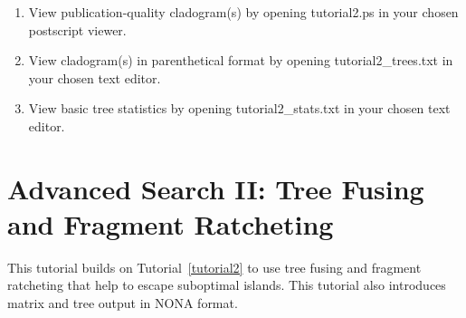 \begin{enumerate}
\item View publication-quality cladogram(s) by opening tutorial2.ps in your chosen 
postscript viewer.
\item View cladogram(s) in parenthetical format by opening tutorial2\_trees.txt in 
your chosen text editor.
\item View basic tree statistics by opening tutorial2\_stats.txt in your chosen 
text editor.

\end{enumerate}

\section[Fusing and Ratcheting]{Advanced Search II: Tree Fusing and Fragment
Ratcheting}{\label{tutorial3}}

This tutorial builds on Tutorial~\ref{tutorial2} to use tree fusing and fragment ratcheting 
that help to escape suboptimal islands. This tutorial also introduces matrix and 
tree output in NONA format.

